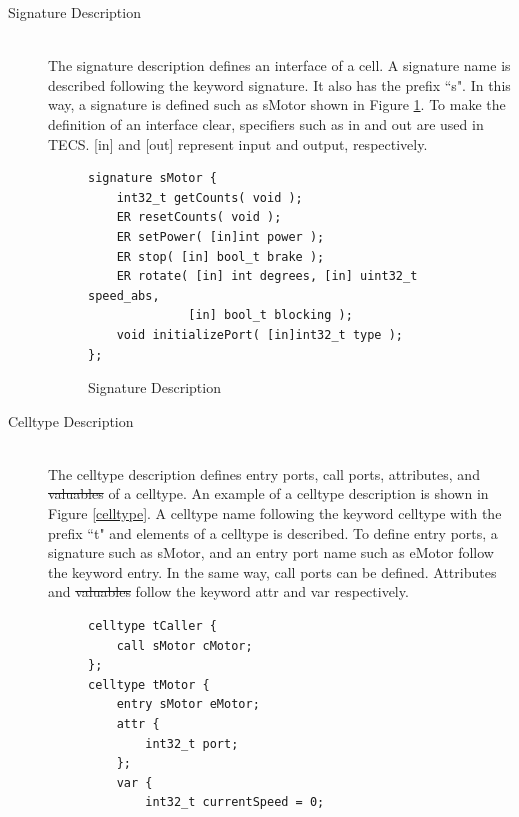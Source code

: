 \documentclass{sig-alternate-05-2015}
\providecommand{\DIFadd}[1]{{\protect\color{blue}\uwave{#1}}} %
\providecommand{\DIFdel}[1]{{\protect\color{red}\sout{#1}}}                      %
\providecommand{\DIFaddbegin}{} %
\providecommand{\DIFaddend}{} %
\providecommand{\DIFdelbegin}{} %
\providecommand{\DIFdelend}{} %
\begin{document}
\begin{description}
    \item[{\mybf Signature Description}]\mbox{}\\
        The {\myit signature} description defines an interface of a {\myit cell}.
        A {\myit signature} name is described following the keyword {\myit signature}.
        It also has the prefix ``s".
        In this way, a {\myit signature} is defined such as sMotor shown in Figure \ref{signature}.
        To make the definition of an interface clear, specifiers such as in and out are used in TECS.
        [in] and [out] represent input and output, respectively.
\begin{figure}[t]
\centering
\begin{lstlisting}
signature sMotor {
    int32_t getCounts( void );
    ER resetCounts( void );
    ER setPower( [in]int power );
    ER stop( [in] bool_t brake );
    ER rotate( [in] int degrees, [in] uint32_t speed_abs,
              [in] bool_t blocking );
    void initializePort( [in]int32_t type );
};
\end{lstlisting}
\vspace{1mm}
\caption{Signature Description}
\vspace{1mm}
\label{signature}
\end{figure}
    \item[{\mybf Celltype Description}]\mbox{}\\
        The {\myit celltype} description defines {\myit entry} ports, {\myit call} ports, attributes, and \DIFdelbegin \DIFdel{valuables }\DIFdelend \DIFaddbegin \DIFadd{variable }\DIFaddend of a {\myit celltype}.
        An example of a {\myit celltype} description is shown in Figure \ref{celltype}.
        A {\myit celltype} name following the keyword {\myit celltype} with the prefix ``t" and elements of a {\myit celltype} is described.
        To define {\myit entry} ports, a {\myit signature} such as sMotor, and an {\myit entry} port name such as eMotor follow the keyword {\myit entry}.
        In the same way, {\myit call} ports can be defined.
        Attributes and \DIFdelbegin \DIFdel{valuables }\DIFdelend \DIFaddbegin \DIFadd{variables }\DIFaddend follow the keyword {\myit attr} and {\myit var} respectively.
\begin{figure}[t]
\centering
\begin{lstlisting}
celltype tCaller {
    call sMotor cMotor;
};
celltype tMotor {
    entry sMotor eMotor;
    attr {
        int32_t port;
    };
    var {
        int32_t currentSpeed = 0;

\end{lstlisting}
\end{figure}
\end{description}
\end{document}
